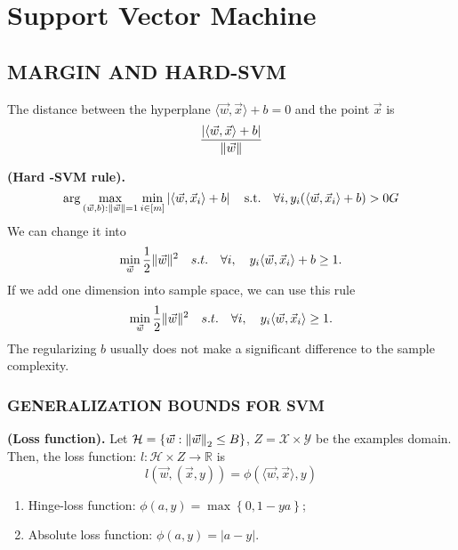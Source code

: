 
\section{Support Vector Machine}%
\label{sec:support_vector_machine}

\subsection{MARGIN AND HARD-SVM}%
\label{sub:margin_and_hard_svm}

\begin{claim}
    The distance between the hyperplane $ \langle \vec{w} , \vec{x} \rangle + b = 0 $ and the point $ \vec{x} $ is
    \[
        \frac{ \left| \langle \vec{w}, \vec{x} \rangle + b\right|}{ \Arrowvert \vec{w} \Arrowvert } 
    \]
\end{claim}

\begin{definition}
    \textbf{(Hard -SVM rule).}
    \[
        \arg\max_{ (\vec{w}, b): \Arrowvert \vec{w} \Arrowvert = 1 } \min_{i \in [m]} \left| \langle \vec{w}, \vec{x}_i \rangle + b \right| \quad \text{s.t.}\quad \forall i, y_i ( \langle \vec{w} , \vec{x}_i \rangle + b) > 0G
    \]
    We can change it into
    \[
        \min_{ \vec{w} } \frac{1}{2} \Arrowvert \vec{w}  \Arrowvert^2 \quad s.t.\quad \forall i,\quad y_i \langle \vec{w}, \vec{x}_i \rangle + b \ge 1.
    \]
    If we add one dimension into sample space, we can use this rule
    \[
        \min_{ \vec{w} } \frac{1}{2} \Arrowvert \vec{w}  \Arrowvert^2 \quad s.t.\quad \forall i,\quad y_i \langle \vec{w}, \vec{x}_i \rangle \ge 1.
    \]
    The regularizing $ b $ usually does not make a significant difference to the sample complexity.
\end{definition}

\subsubsection{GENERALIZATION BOUNDS FOR SVM}%

\begin{definition}
    \textbf{(Loss function).}
    Let $ \mathcal{H} = \left\{ \vec{w} : {\Arrowvert \vec{w}  \Arrowvert}_2 \le B \right\} $, $ Z = \mathcal{X}\times \mathcal{Y} $ be the examples domain. Then, the loss function: $ l : \mathcal{H} \times Z \rightarrow \mathbb{R} $ is
    \begin{equation}
        l( \vec{w} , ( \vec{x} , y) ) = \phi (\langle \vec{w}, \vec{x} \rangle, y)
    \end{equation}
    \begin{enumerate}
        \item Hinge-loss function: $ \phi(a, y) = \max \left\{ 0, 1-ya \right\}$;
        \item Absolute loss function: $ \phi(a, y) = \left| a - y \right| $.
    \end{enumerate}
\end{definition}

